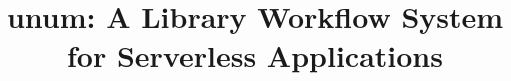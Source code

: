 \documentclass[letterpaper,twocolumn,10pt]{article}
\begin{document}

\date{}

\title{\Large \bf unum: A Library Workflow System for Serverless Applications}

\author{
} %

\maketitle
\thispagestyle{empty}








\end{document}
